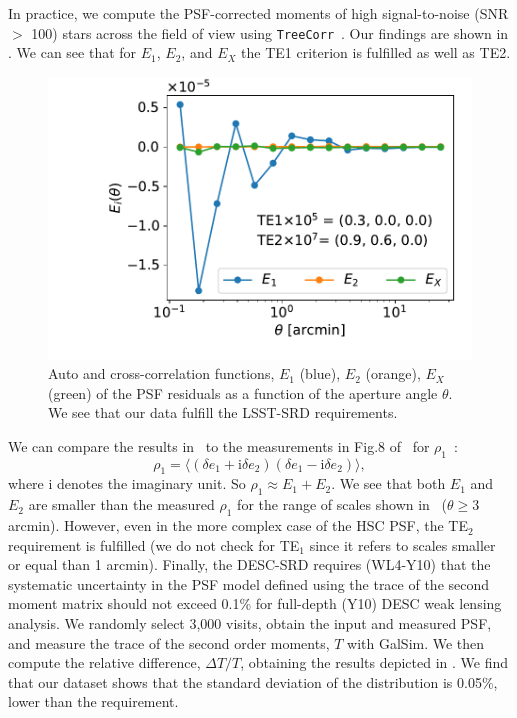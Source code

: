 \documentclass[a4paper,fleqn,usenatbib]{mnras}
\begin{document}
In practice, we compute the PSF-corrected moments of high signal-to-noise (SNR $>$ 100) stars across the field of view using \texttt{TreeCorr}~\citep{2004MNRAS.352..338J}. Our findings are shown in . We can see that for $E_{1}$, $E_{2}$, and $E_{X}$ the TE1 criterion is fulfilled as well as TE2.
\begin{figure}
\centering
\includegraphics[width=0.85\columnwidth]{TEx}
\caption{Auto and cross-correlation functions, $E_{1}$ (blue), $E_{2}$ (orange), $E_{X}$ (green) of the PSF residuals as a function of the aperture angle $\theta$. We see that our data fulfill the LSST-SRD requirements.}
\label{fig:TEx}
\end{figure}
We can compare the results in~ to the measurements in Fig.8 of~\citet{2018PASJ...70S..25M} for $\rho_{1}$~\citep{2010MNRAS.404..350R}:
\begin{equation}
\rho_{1} = \langle (\delta e_{1}+\mathrm{i}\delta e_{2})(\delta e_{1}-\mathrm{i} \delta e_{2}) \rangle,
\end{equation}
where $\mathrm{i}$ denotes the imaginary unit. So $\rho_{1} \approx E_{1} + E_{2}$. We see that both $E_{1}$ and $E_{2}$ are smaller than the measured $\rho_{1}$ for the range of scales shown in~\citet{2018PASJ...70S..25M} ($\theta \geq 3$ arcmin). However, even in the more complex case of the HSC PSF, the TE$_{2}$ requirement is fulfilled (we do not check for TE$_{1}$  since it refers to scales smaller or equal than 1 arcmin).
Finally, the DESC-SRD requires (WL4-Y10) that the systematic uncertainty in the PSF model defined using the trace of the second moment matrix should not exceed 0.1\% for full-depth (Y10) DESC weak lensing analysis. We randomly select 3,000 visits, obtain the input and measured PSF, and measure the trace of the second order moments, $T$ with GalSim. We then compute the relative difference, $\Delta T/T$, obtaining the results depicted in . We find that our dataset shows that the standard deviation of the distribution is 0.05\%, lower than the requirement.
\end{document}
